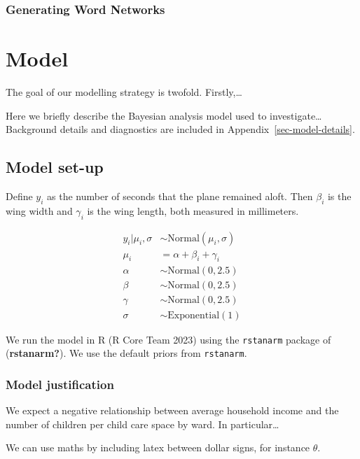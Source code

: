 \documentclass[
  letterpaper,
  DIV=11,
  numbers=noendperiod]{scrartcl}
\begin{document}
\subsubsection{Generating Word Networks}\label{generating-word-networks}

\section{Model}\label{model}

The goal of our modelling strategy is twofold. Firstly,\ldots{}

Here we briefly describe the Bayesian analysis model used to
investigate\ldots{} Background details and diagnostics are included in
Appendix~\ref{sec-model-details}.

\subsection{Model set-up}\label{model-set-up}

Define \(y_i\) as the number of seconds that the plane remained aloft.
Then \(\beta_i\) is the wing width and \(\gamma_i\) is the wing length,
both measured in millimeters.

\begin{align} 
y_i|\mu_i, \sigma &\sim \mbox{Normal}(\mu_i, \sigma) \\
\mu_i &= \alpha + \beta_i + \gamma_i\\
\alpha &\sim \mbox{Normal}(0, 2.5) \\
\beta &\sim \mbox{Normal}(0, 2.5) \\
\gamma &\sim \mbox{Normal}(0, 2.5) \\
\sigma &\sim \mbox{Exponential}(1)
\end{align}

We run the model in R (R Core Team 2023) using the \texttt{rstanarm}
package of (\textbf{rstanarm?}). We use the default priors from
\texttt{rstanarm}.

\subsubsection{Model justification}\label{model-justification}

We expect a negative relationship between average household income and
the number of children per child care space by ward. In
particular\ldots{}

We can use maths by including latex between dollar signs, for instance
\(\theta\).
\end{document}
